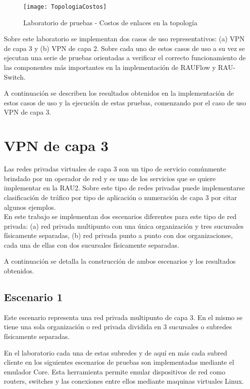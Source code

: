 \begin{figure}[ht!] 
\centering    
\texttt{[image: TopologiaCostos]}
\caption[Laboratorio de pruebas - Costos de enlaces en la topolog\'ia]{Laboratorio de pruebas - Costos de enlaces en la topolog\'ia}
\label{fig:LaboratorioDePruebasCostos}
\end{figure}

Sobre este laboratorio se implementan dos casos de uso representativos: (a) VPN de capa 3 y (b) VPN de capa 2. Sobre cada uno de estos casos de uso a su vez se ejecutan una serie de pruebas orientadas a verificar el correcto funcionamiento de las componentes m\'as importantes en la implementaci\'on de RAUFlow y RAU-Switch.

A continuaci\'on se describen los resultados obtenidos en la implementaci\'on de estos casos de uso y la ejecuci\'on de estas pruebas, comenzando por el caso de uso VPN de capa 3.

\section{VPN de capa 3}

Las redes privadas virtuales de capa 3 son un tipo de servicio comúnmente brindado por un operador de red y es uno de los servicios que se quiere implementar en la RAU2. Sobre este tipo de redes privadas puede implementarse clasificaci\'on de tr\'afico por tipo de aplicaci\'on o numeraci\'on de capa 3 por citar algunos ejemplos.\\

En este trabajo se implementan dos escenarios diferentes para este tipo de red privada: (a) red privada multipunto con una \'unica organizaci\'on y tres sucursales f\'isicamente separadas, (b) red privada punto a punto con dos organizaciones, cada una de ellas con dos sucursales f\'isicamente separadas.

A continuaci\'on se detalla la construcci\'on de ambos escenarios y los resultados obtenidos.

\subsection{Escenario 1}

Este escenario representa una red privada multipunto de capa 3. En el mismo se tiene una sola organizaci\'on o red privada dividida en 3 sucursales o subredes físicamente separadas.

En el laboratorio cada una de estas subredes y de aqu\'i en m\'as cada subred cliente en los siguientes escenarios de pruebas son implementadas mediante el emulador Core\cite{Core}. Esta herramienta permite emular dispositivos de red como routers, switches y las conexiones entre ellos mediante maquinas virtuales Linux. 

